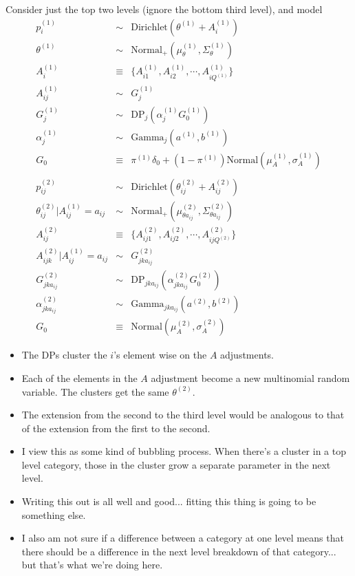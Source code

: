 \documentclass[11pt]{article}
\begin{document}
Consider just the top two levels (ignore the bottom third level),
and model 
\begin{eqnarray*} 
p^{(1)}_i &\sim & \text{Dirichlet}(\theta^{(1)} + A_i^{(1)})\\
\theta^{(1)} &\sim& \text{Normal}_+(\mu^{(1)}_{\theta}, \Sigma^{(1)}_{\theta})\\
A_i^{(1)} &\equiv& \{A_{i1}^{(1)}, A_{i2}^{(1)}, \cdots, A^{(1)}_{iQ^{(1)}}\}\\
A_{ij}^{(1)}  &\sim & G_j^{(1)} \\
G_j^{(1)} &\sim& \text{DP}_j(\alpha_j^{(1)} G_{0}^{(1)})\\
\alpha_j^{(1)} &\sim& \text{Gamma}_j(a^{(1)},b^{(1)})\\
G_{0} &\equiv&  \pi^{(1)} \delta_0 + (1-\pi^{(1)})\text{Normal}(\mu_{A}^{(1)}, \sigma_{A}^{(1)}) \\
\\ 
p^{(2)}_{ij} &\sim & \text{Dirichlet}(\theta^{(2)}_{ij} + A_{ij}^{(2)})\\
\theta^{(2)}_{ij} | A_{ij}^{(1)} = a_{ij} &\sim& 
\text{Normal}_+(\mu^{(2)}_{\theta a_{ij}}, \Sigma^{(2)}_{\theta a_{ij}})\\
A^{(2)}_{ij} &\equiv& \{A^{(2)}_{ij1}, A^{(2)}_{ij2}, \cdots, A^{(2)}_{ijQ^{(2)} }\}\\
A^{(2)}_{ijk} | A_{ij}^{(1)} = a_{ij} &\sim & G_{jk a_{ij}}^{(2)}\\ 
G_{jk a_{ij}}^{(2)} &\sim & \text{DP}_{jk a_{ij}}(\alpha_{jk a_{ij}}^{(2)} G^{(2)}_{0})\\
\alpha_{jk a_{ij}}^{(2)} &\sim& \text{Gamma}_{jk a_{ij}}(a^{(2)},b^{(2)})\\
G_{0} &\equiv& \text{Normal}(\mu^{(2)}_{A}, \sigma^{(2)}_{A}) 
\end{eqnarray*}

\begin{itemize}
\item The DPs cluster the $i$'s element wise on the $A$ adjustments.
\item Each of the elements  in the $A$ adjustment become a new multinomial
random variable.   The clusters get the same $\theta^{(2)}$. 
\item The extension from the second to the third level would be 
analogous to that of the extension from the first to the second. 
\item I view this as some kind of bubbling process.  
When there's a cluster in a top level category, those in the 
cluster grow a separate parameter in the next level.
\item Writing this out is all well and good... fitting this thing is going to be something else.
\item I also am not sure if a difference between a category at one level 
means that there should be a difference in the next level breakdown of that 
category... but that's what we're doing here.    
\end{itemize}
\end{document}
